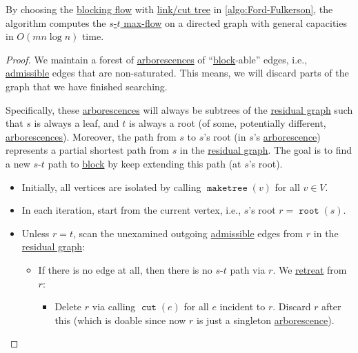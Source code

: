 \begin{theorem}\label{thm:Ford-Fulkerson-link-cut-tree}
	By choosing the \hyperref[def:blocking-flow]{blocking flow} with \hyperref[def:link-cut-tree]{link/cut tree} in \autoref{algo:Ford-Fulkerson}, the algorithm computes the \hyperref[prb:s-t-max-flow]{\(s\)-\(t\) max-flow} on a directed graph with general capacities in \(O(mn \log n)\) time.
\end{theorem}
\begin{proof}
	We maintain a forest of \hyperref[def:arborescence]{arborescences} of ``\hyperref[algo:general-adaptive-DFS-block]{block}-able'' edges, i.e., \hyperref[def:admissible]{admissible} edges that are non-saturated. This means, we will discard parts of the graph that we have finished searching.

	Specifically, these \hyperref[def:arborescence]{arborescences} will always be subtrees of the \hyperref[def:residual-graph]{residual graph} such that \(s\) is always a leaf, and \(t\) is always a root (of some, potentially different, \hyperref[def:arborescence]{arborescences}). Moreover, the path from \(s\) to \(s\)'s root (in \(s\)'s \hyperref[def:arborescence]{arborescence}) represents a partial shortest path from \(s\) in the \hyperref[def:residual-graph]{residual graph}. The goal is to find a new \(s\)-\(t\) path to \hyperref[algo:general-adaptive-DFS-block]{block} by keep extending this path (at \(s\)'s root).
	\begin{itemize}
		\item Initially, all vertices are isolated by calling \(\operatorname{\texttt{maketree}}(v) \) for all \(v \in V\).
		\item In each iteration, start from the current vertex, i.e., \(s\)'s root \(r = \operatorname{\texttt{root}}(s) \).
		\item Unless \(r = t\), scan the unexamined outgoing \hyperref[def:admissible]{admissible} edges from \(r\) in the \hyperref[def:residual-graph]{residual graph}:
		      \begin{itemize}
			      \item If there is no edge at all, then there is no \(s\)-\(t\) path via \(r\). We \hyperref[algo:general-adaptive-DFS-retreat]{retreat} from \(r\):
			            \begin{itemize}
				            \item Delete \(r\) via calling \(\operatorname{\texttt{cut}} (e)\) for all \(e\) incident to \(r\). Discard \(r\) after this (which is doable since now \(r\) is just a singleton \hyperref[def:arborescence]{arborescence}).

\end{itemize}
\end{itemize}
\end{itemize}
\end{proof}
